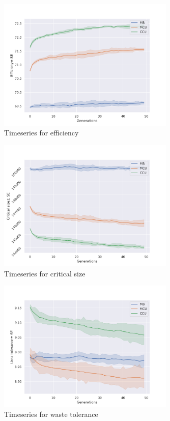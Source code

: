 \begin{figure}[p]
  \centering
  \includegraphics[trim = 0 0 50 50, clip, width=0.75\textwidth]{C4/Figs/eff}
  \caption{Timeseries for efficiency}
  \label{eff}
\end{figure}
\begin{figure}[p]
  \centering
  \includegraphics[trim = 0 0 50 50, clip, width=0.75\textwidth]{C4/Figs/mc}
  \caption{Timeseries for critical size}
  \label{mc}
\end{figure}

\clearpage

\begin{figure}[t]
  \centering
  \includegraphics[trim = 0 0 50 50, clip, width=0.75\textwidth]{C4/Figs/wtol}
  \caption{Timeseries for waste tolerance}
  \label{wtol}
\end{figure}
